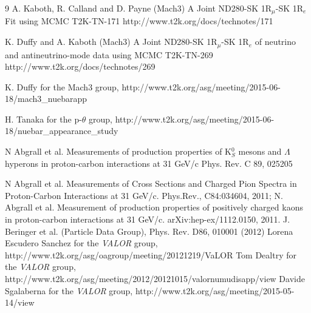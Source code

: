 \begin{thebibliography}{9}
  A. Kaboth, R. Calland and D. Payne (Mach3)
  A Joint ND280-SK 1$\text{R}_{\mu}$-SK 1$\text{R}_e$ Fit using MCMC 
  T2K-TN-171
  http://www.t2k.org/docs/technotes/171

  K. Duffy and A. Kaboth (Mach3)
  A Joint ND280-SK 1$\text{R}_{\mu}$-SK 1$\text{R}_e$ of neutrino and antineutrino-mode data using MCMC  
  T2K-TN-269
  http://www.t2k.org/docs/technotes/269

K. Duffy for the Mach3 group,
http://www.t2k.org/asg/meeting/2015-06-18/mach3\_nuebarapp

H. Tanaka for the p-$\theta$ group,
http://www.t2k.org/asg/meeting/2015-06-18/nuebar\_appearance\_study

%
%

  N Abgrall et al. Measurements of production properties of K$^{0}_{S}$ mesons and $\Lambda$ hyperons in proton-carbon interactions at 31 GeV/c
  Phys. Rev. C 89, 025205

  N Abgrall et al. Measurements of Cross Sections and Charged Pion Spectra in Proton-Carbon Interactions
  at 31 GeV/c. Phys.Rev., C84:034604, 2011;
  N. Abgrall et al. Measurement of production properties of positively charged kaons in proton-carbon
  interactions at 31 GeV/c. arXiv:hep-ex/1112.0150, 2011.
%
%
  J. Beringer et al. (Particle Data Group), Phys. Rev. D86, 010001 (2012)
%
%
  Lorena Escudero Sanchez for the {\em VALOR} group, 
  http://www.t2k.org/asg/oagroup/meeting/20121219/VaLOR%
  Tom Dealtry for the {\em VALOR} group,
  http://www.t2k.org/asg/meeting/2012/20121015/valornumudisapp/view
  Davide Sgalaberna for the {\em VALOR} group,
  http://www.t2k.org/asg/meeting/2015-05-14/view


\end{thebibliography}
